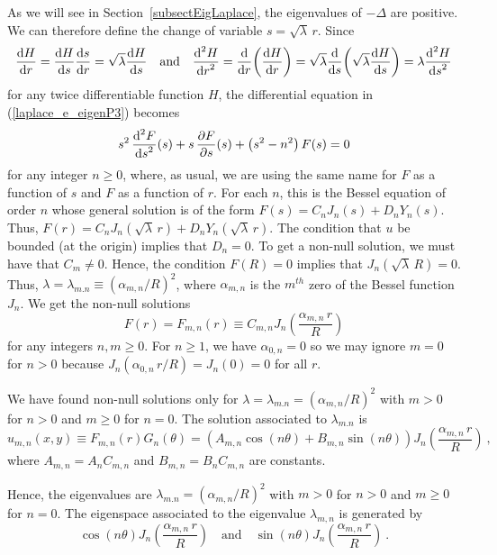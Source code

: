 As we will see in Section~\ref{subsectEigLaplace}, the eigenvalues of
$-\Delta$ are positive.  We can therefore define the change of
variable $s=\sqrt{\lambda}\,r$.  Since
\[
\dydx{H}{r} = \dydx{H}{s} \dydx{s}{r} = \sqrt{\lambda} \dydx{H}{s}
\quad \text{and} \quad
\dydxn{H}{r}{2} = \dfdx{\left(\dydx{H}{r}\right)}{r}
= \sqrt{\lambda}\dfdx{\left(\sqrt{\lambda}\dydx{H}{s}\right)}{s}
= \lambda \dydxn{H}{s}{2}
\]
for any twice differentiable function $H$, the differential equation
in (\ref{laplace_e_eigenP3}) becomes
\[
s^2\,\dydxn{F}{s}{2}(s) + s\, \pdydx{F}{s}(s)
+ \left(s^2 -n^2\right) F(s) = 0
\]
for any integer $n \geq 0$, where, as usual, we are using the same name
for $F$ as a function of $s$ and $F$ as a function of $r$.  For each
$n$, this is the Bessel equation of order $n$ whose general solution
is of the form $F(s) = C_n J_n(s) + D_n Y_n(s)$.  Thus,
$\displaystyle F(r) = C_n J_n\left(\sqrt{\lambda}\, r\right) + D_n
Y_n\left(\sqrt{\lambda} \, r\right)$.
The condition that $u$ be bounded (at the origin) implies that $D_n=0$.
To get a non-null solution, we must have that $C_m \neq 0$.
Hence, the condition $F(R) = 0$ implies that
$\displaystyle J_n\left(\sqrt{\lambda}\, R\right)= 0$.  Thus,
$\displaystyle \lambda = \lambda_{m.n} \equiv \left(\alpha_{m,n}/R\right)^2$,
where $\alpha_{m,n}$ is the $m^{th}$ zero of the Bessel function $J_n$.
We get the non-null solutions
\[
  F(r) = F_{m,n}(r) \equiv C_{m,n} J_n\left(\frac{\alpha_{m,n}\,r}{R}\right)
\]
for any integers $n,m \geq 0$.
For $n\geq 1$, we have $\alpha_{0,n} =0$ so we may ignore $m=0$ for
$n>0$ because $\displaystyle J_n\left(\alpha_{0,n}\,r/R\right) = J_n(0) = 0$
for all $r$.

We have found non-null solutions only for
$\displaystyle \lambda = \lambda_{m.n} = \left(\alpha_{m,n}/R\right)^2$
with $m>0$ for $n>0$ and $m\geq 0$ for $n=0$.
The solution associated to $\lambda_{m.n}$ is
\[
u_{m,n}(x,y) \equiv F_{m,n}(r) G_n(\theta) =
\left( A_{m,n} \cos\left(n\theta\right)
+ B_{m,n} \sin\left(n\theta\right) \right)
J_n\left(\frac{\alpha_{m,n}\,r}{R}\right) \  ,
\]
where $A_{m,n} = A_n C_{m,n}$ and $B_{m,n} = B_n C_{m,n}$ are constants.

Hence, the eigenvalues are
$\lambda_{m.n} = \left(\alpha_{m,n}/R\right)^2$ 
with $m>0$ for $n>0$ and $m\geq 0$ for $n=0$.
The eigenspace associated to the eigenvalue $\lambda_{m,n}$ is
generated by
\[
\cos\left(n\theta\right)J_n\left(\frac{\alpha_{m,n}\,r}{R}\right)
\quad \text{and} \quad
\sin\left(n\theta\right)J_n\left(\frac{\alpha_{m,n}\,r}{R}\right) \ .
\]

